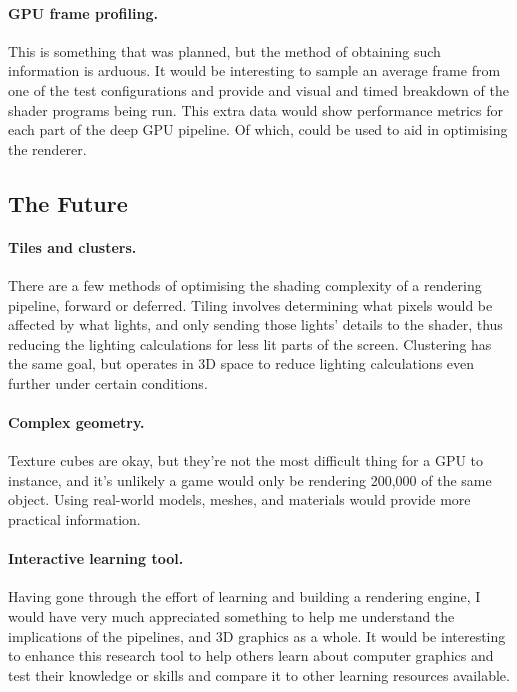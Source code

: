 \documentclass[11pt]{article}
\begin{document}
\paragraph{GPU frame profiling.}
This is something that was planned, but the method of obtaining such information is arduous.
It would be interesting to sample an average frame from one of the test configurations and provide and visual and timed breakdown of the shader programs being run.
This extra data would show performance metrics for each part of the deep GPU pipeline.
Of which, could be used to aid in optimising the renderer.

\subsection{The Future}

\paragraph{Tiles and clusters.}
There are a few methods of optimising the shading complexity of a rendering pipeline, forward or deferred.
Tiling involves determining what pixels would be affected by what lights, and only sending those lights' details to the shader, thus reducing the lighting calculations for less lit parts of the screen.
Clustering has the same goal, but operates in 3D space to reduce lighting calculations even further under certain conditions\cite{olsson_clustered_2012}.

\paragraph{Complex geometry.}
Texture cubes are okay, but they're not the most difficult thing for a GPU to instance, and it's unlikely a game would only be rendering 200,000 of the same object.
Using real-world models, meshes, and materials would provide more practical information.

\paragraph{Interactive learning tool.}
Having gone through the effort of learning and building a rendering engine, I would have very much appreciated something to help me understand the implications of the pipelines, and 3D graphics as a whole.
It would be interesting to enhance this research tool to help others learn about computer graphics and test their knowledge or skills and compare it to other learning resources available.
\end{document}
